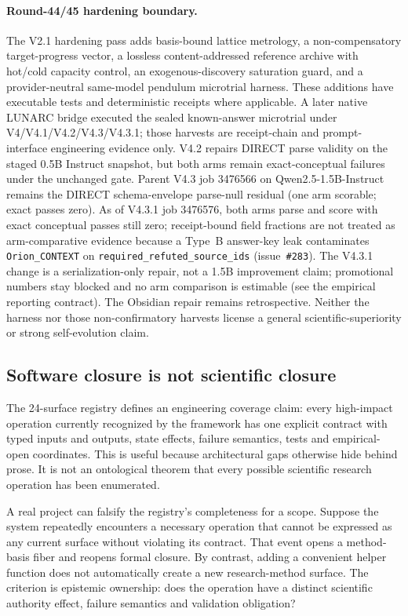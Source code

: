 \paragraph{Round-44/45 hardening boundary.}
The V2.1 hardening pass adds basis-bound lattice metrology, a non-compensatory target-progress vector, a lossless content-addressed reference archive with hot/cold capacity control, an exogenous-discovery saturation guard, and a provider-neutral same-model pendulum microtrial harness. These additions have executable tests and deterministic receipts where applicable. A later native LUNARC bridge executed the sealed known-answer microtrial under V4/V4.1/V4.2/V4.3/V4.3.1; those harvests are receipt-chain and prompt-interface engineering evidence only. V4.2 repairs DIRECT parse validity on the staged 0.5B Instruct snapshot, but both arms remain exact-conceptual failures under the unchanged gate. Parent V4.3 job 3476566 on Qwen2.5-1.5B-Instruct remains the DIRECT schema-envelope parse-null residual (one arm scorable; exact passes zero). As of V4.3.1 job 3476576, both arms parse and score with exact conceptual passes still zero; receipt-bound field fractions are not treated as arm-comparative evidence because a Type~B answer-key leak contaminates \texttt{Orion\_CONTEXT} on \texttt{required\_refuted\_source\_ids} (issue~\texttt{\#283}). The V4.3.1 change is a serialization-only repair, not a 1.5B improvement claim; promotional numbers stay blocked and no arm comparison is estimable (see the empirical reporting contract). The Obsidian repair remains retrospective. Neither the harness nor those non-confirmatory harvests license a general scientific-superiority or strong self-evolution claim.

\subsection{Software closure is not scientific closure}

The 24-surface registry defines an engineering coverage claim: every high-impact operation currently recognized by the framework has one explicit contract with typed inputs and outputs, state effects, failure semantics, tests and empirical-open coordinates. This is useful because architectural gaps otherwise hide behind prose. It is not an ontological theorem that every possible scientific research operation has been enumerated.

A real project can falsify the registry's completeness for a scope. Suppose the system repeatedly encounters a necessary operation that cannot be expressed as any current surface without violating its contract. That event opens a method-basis fiber and reopens formal closure. By contrast, adding a convenient helper function does not automatically create a new research-method surface. The criterion is epistemic ownership: does the operation have a distinct scientific authority effect, failure semantics and validation obligation?

